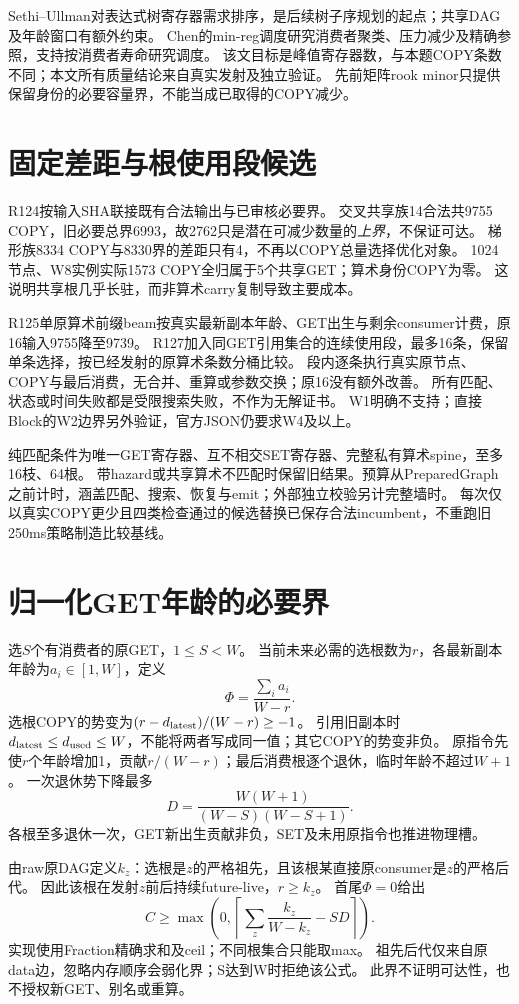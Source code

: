 \documentclass[UTF8,11pt,a4paper]{ctexart}
\begin{document}
Sethi--Ullman\cite{sethi}对表达式树寄存器需求排序，是后续树子序规划的起点；共享DAG及年龄窗口有额外约束。
Chen的min-reg调度\cite{chen}研究消费者聚类、压力减少及精确参照，支持按消费者寿命研究调度。
该文目标是峰值寄存器数，与本题COPY条数不同；本文所有质量结论来自真实发射及独立验证。
先前矩阵rook minor\cite{harvey}只提供保留身份的必要容量界，不能当成已取得的COPY减少。

\section{固定差距与根使用段候选}
R124按输入SHA联接既有合法输出与已审核必要界。
交叉共享族14合法共9755 COPY，旧必要总界6993，故2762只是潜在可减少数量的\emph{上界}，不保证可达。
梯形族8334 COPY与8330界的差距只有4，不再以COPY总量选择优化对象。
1024节点、W8实例实际1573 COPY全归属于5个共享GET；算术身份COPY为零。
这说明共享根几乎长驻，而非算术carry复制导致主要成本。

R125单原算术前缀beam按真实最新副本年龄、GET出生与剩余consumer计费，原16输入9755降至9739。
R127加入同GET引用集合的连续使用段，最多16条，保留单条选择，按已经发射的原算术条数分桶比较。
段内逐条执行真实原节点、COPY与最后消费，无合并、重算或参数交换；原16没有额外改善。
所有匹配、状态或时间失败都是受限搜索失败，不作为无解证书。
W1明确不支持；直接Block的W2边界另外验证，官方JSON仍要求W4及以上。

纯匹配条件为唯一GET寄存器、互不相交SET寄存器、完整私有算术spine，至多16枝、64根。
带hazard或共享算术不匹配时保留旧结果。预算从PreparedGraph之前计时，涵盖匹配、搜索、恢复与emit；外部独立校验另计完整墙时。
每次仅以真实COPY更少且四类检查通过的候选替换已保存合法incumbent，不重跑旧250ms策略制造比较基线。

\section{归一化GET年龄的必要界}
选$S$个有消费者的原GET，$1\le S<W$。
当前未来必需的选根数为$r$，各最新副本年龄为$a_i\in[1,W]$，定义
\[ \Phi=\frac{\sum_i a_i}{W-r}. \]
选根COPY的势变为$(r-d_{\rm latest})/(W-r)\ge-1$。
引用旧副本时$d_{\rm latest}\le d_{\rm used}\le W$，不能将两者写成同一值；其它COPY的势变非负。
原指令先使$r$个年龄增加1，贡献$r/(W-r)$；最后消费根逐个退休，临时年龄不超过$W+1$。
一次退休势下降最多
\[D=\frac{W(W+1)}{(W-S)(W-S+1)}.\]
各根至多退休一次，GET新出生贡献非负，SET及未用原指令也推进物理槽。

由raw原DAG定义$k_z$：选根是$z$的严格祖先，且该根某直接原consumer是$z$的严格后代。
因此该根在发射$z$前后持续future-live，$r\ge k_z$。
首尾$\Phi=0$给出
\[C\ge\max\left(0,\left\lceil\sum_z\frac{k_z}{W-k_z}-SD\right\rceil\right).\]
实现使用Fraction精确求和及ceil；不同根集合只能取max。
祖先后代仅来自原data边，忽略内存顺序会弱化界；S达到W时拒绝该公式。
此界不证明可达性，也不授权新GET、别名或重算。
\end{document}
